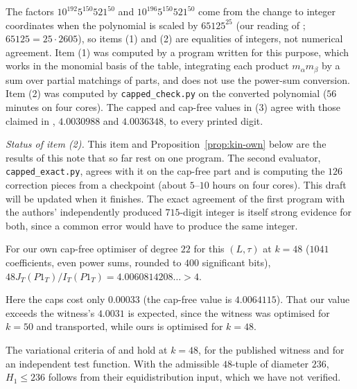 The factors $10^{192}5^{150}521^{50}$ and $10^{196}5^{150}521^{50}$ come from the
change to integer coordinates when the polynomial is scaled by $65125^{25}$
(our reading of \cite[Eq.~(71)]{SY26}; $65125=25\cdot2605$), so items (1) and
(2) are equalities of integers, not numerical agreement. Item (1) was computed
by a program written for this purpose, which works in the monomial basis of
the table, integrating each product $m_\alpha m_\beta$ by a sum over partial
matchings of parts, and does not use the power-sum conversion. Item (2) was
computed by \texttt{capped\_check.py} on the converted polynomial ($56$ minutes
on four cores). The capped and cap-free values in (3) agree with those claimed
in \cite{Kin26}, $4.0030988$ and $4.0036348$, to every printed digit.

\emph{Status of item (2).} This item and Proposition~\ref{prop:kin-own}
below are the results of this note that so far rest on one program. The second evaluator, \texttt{capped\_exact.py}, agrees
with it on the cap-free part and is computing the $126$ correction pieces
from a checkpoint (about $5$--$10$ hours on four cores). This draft will be
updated when it finishes. The exact agreement of the first program with the
authors' independently produced $715$-digit integer is itself strong evidence
for both, since a common error would have to produce the same integer.

\begin{proposition}\label{prop:kin-own}
For our own cap-free optimiser of degree $22$ for this $(L,\tau)$ at $k=48$
($1041$ coefficients, even power sums, rounded to $400$ significant bits),
$48J_T(P1_T)/I_T(P1_T)=4.0060814208\ldots>4$.
\end{proposition}

Here the caps cost only $0.00033$ (the cap-free value is $4.0064115$). That our
value exceeds the witness's $4.0031$ is expected, since the witness was
optimised for $k=50$ and transported, while ours is optimised for $k=48$.

\begin{corollary}
The variational criteria of \cite{Kin26} and \cite{SY26} hold at $k=48$, for
the published witness and for an independent test function. With the
 admissible $48$-tuple of diameter $236$, $H_1\le236$
follows from their equidistribution input, which we have not verified.
\end{corollary}

